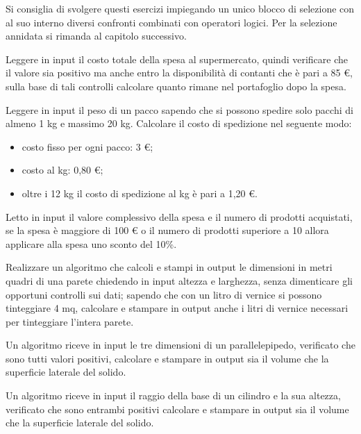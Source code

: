 Si consiglia di svolgere questi esercizi impiegando un unico blocco di selezione con al suo interno diversi confronti combinati con operatori logici. Per la selezione annidata si rimanda al capitolo successivo.

\begin{exercise}
	Leggere in input il costo totale della spesa al supermercato, quindi verificare che il valore sia positivo ma anche entro la disponibilità di contanti che è pari a 85 €, sulla base di tali controlli calcolare quanto rimane nel portafoglio dopo la spesa.
\end{exercise}

\begin{exercise}
	Leggere in input il peso di un pacco sapendo che si possono spedire solo pacchi di almeno 1 kg e massimo 20 kg. Calcolare il costo di spedizione nel seguente modo:
	\begin{itemize}
		\item costo fisso per ogni pacco: 3 €;
		\item costo al kg: 0,80 €;
		\item oltre i 12 kg il costo di spedizione al kg è pari a 1,20 €.
	\end{itemize}
\end{exercise}

\begin{exercise}
	Letto in input il valore complessivo della spesa e il numero di prodotti acquistati, se la spesa è maggiore di 100 € o il numero di prodotti superiore a 10 allora applicare alla spesa uno sconto del 10\%.
\end{exercise}

\begin{exercise}
	Realizzare un algoritmo che calcoli e stampi in output le dimensioni in metri quadri di una parete chiedendo in input altezza e larghezza, senza dimenticare gli opportuni controlli sui dati; sapendo che con un litro di vernice si possono tinteggiare 4 mq, calcolare e stampare in output anche i litri di vernice necessari per tinteggiare l’intera parete.
\end{exercise}

\begin{exercise}
	Un algoritmo riceve in input le tre dimensioni di un parallelepipedo, verificato che sono tutti valori positivi, calcolare e stampare in output sia il volume che la superficie laterale del solido.
\end{exercise}

\begin{exercise}
	Un algoritmo riceve in input il raggio della base di un cilindro e la sua altezza, verificato che sono entrambi positivi calcolare e stampare in output sia il volume che la superficie laterale del solido.
\end{exercise}

